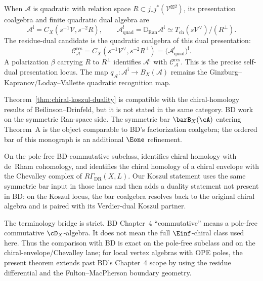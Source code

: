 \begin{remark}\label{rem:comparison-classical}
When $\mathcal{A}$ is quadratic with relation space
$R \subset j_*j^*(\mathcal{V}^{\boxtimes 2})$, its presentation
coalgebra and finite quadratic dual algebra are
\[
 \mathcal A^{\mathrm i}
 =C_X(s^{-1}\mathcal V,s^{-2}R),
 \qquad
 \mathcal A^!_{\mathrm{quad}}
 =\mathbb D_{\operatorname{Ran}}\mathcal A^{\mathrm i}
 \simeq T_{\mathrm{ch}}(s\mathcal V^\vee)/(R^\perp).
\]
The residue-dual candidate is the quadratic coalgebra of this dual
presentation:
\[
 \mathcal C_{\mathcal A}^{\mathrm{res}}
 =C_X(s^{-1}\mathcal V^\vee,s^{-2}R^\perp)
 =\bigl(\mathcal A^!_{\mathrm{quad}}\bigr)^{\mathrm i}.
\]
A polarization $\beta$ carrying $R$ to $R^\perp$ identifies
$\mathcal A^{\mathrm i}$ with
$\mathcal C_{\mathcal A}^{\mathrm{res}}$.  This is the precise
self-dual presentation locus.  The map
$q_{\mathcal A}\colon\mathcal A^{\mathrm i}\to B_X(\mathcal A)$
remains the Ginzburg--Kapranov/Loday--Vallette quadratic recognition
map.
\end{remark}

\begin{remark}[BD comparison]\label{rem:bd-comparison-koszul}
Theorem~\ref{thm:chiral-koszul-duality} is compatible with the
chiral-homology results of Beilinson--Drinfeld, but it is not stated in
the same category. BD work on the symmetric Ran-space side. The
symmetric bar $\barB_X(\cA)$ entering Theorem~A is the object
comparable to BD's factorization coalgebra; the ordered bar of this
monograph is an additional $\Eone$ refinement.

On the pole-free BD-commutative subclass,
\cite[Theorem~4.6.1]{BD04} identifies chiral homology with de~Rham
cohomology, and \cite[Theorem~4.8.1]{BD04} identifies the chiral
homology of a chiral envelope with the Chevalley complex of
$R\Gamma_{\mathrm{DR}}(X,L)$. Our Koszul statement uses the same
symmetric bar input in those lanes and then adds a duality statement not
present in BD: on the Koszul locus, the bar coalgebra resolves back to
the original chiral algebra and is paired with its Verdier-dual Koszul
partner.

The terminology bridge is strict. BD Chapter~4 ``commutative'' means a
pole-free commutative $\cD_X$-algebra. It does not mean the full
$\Einf$-chiral class used here. Thus the comparison with BD is exact on
the pole-free subclass and on the chiral-envelope/Chevalley lane; for
local vertex algebras with OPE poles, the present theorem extends past
BD's Chapter~4 scope by using the residue differential and the
Fulton--MacPherson boundary geometry.
\end{remark}

